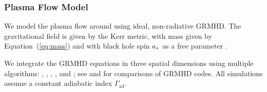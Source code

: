 \subsubsection{Plasma Flow Model}

We model the plasma flow around \sgra using ideal, non-radiative GRMHD.
The gravitational field is given by the Kerr metric, with mass given by Equation~(\ref{eq:mass}) and with black hole spin $a_*$ as a free parameter \citep[see e.g.,][]{2003ApJ...589..444G, 2005ApJ...635..723A, 2007A&A...473...11D}.

We integrate the GRMHD equations in three spatial dimensions using multiple algorithms:
\kharma   \citep{2021JOSS....6.3336P},
\bhac     \citep{2017ComAC...4....1P},
\hamr     \citep{Liska2018},
\koral    \citep{2013MNRAS.429.3533S}, and
\athenapp \citep{2016ApJS..225...22W};
see \citet{2019ApJS..243...26P} and \citet{Olivares_et_al} for comparisons of GRMHD codes.
All simulations assume a constant adiabatic index $\Gamma_\mathrm{ad}$.

